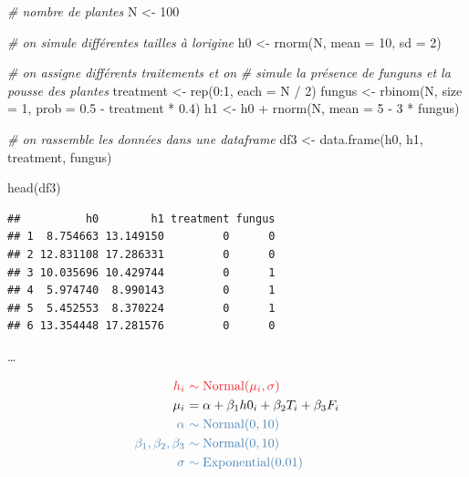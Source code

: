 \documentclass[
  a4paper,11pt,twoside,onecolumn,openright,final,oldfontcommands]{memoir}
\newenvironment{Shaded}{\begin{snugshade}}{\end{snugshade}}
\newcommand{\AttributeTok}[1]{\textcolor[rgb]{0.77,0.63,0.00}{#1}}
\newcommand{\CommentTok}[1]{\textcolor[rgb]{0.56,0.35,0.01}{\textit{#1}}}
\newcommand{\DecValTok}[1]{\textcolor[rgb]{0.00,0.00,0.81}{#1}}
\newcommand{\FloatTok}[1]{\textcolor[rgb]{0.00,0.00,0.81}{#1}}
\newcommand{\FunctionTok}[1]{\textcolor[rgb]{0.00,0.00,0.00}{#1}}
\newcommand{\NormalTok}[1]{#1}
\newcommand{\OtherTok}[1]{\textcolor[rgb]{0.56,0.35,0.01}{#1}}
\newcommand{\SpecialCharTok}[1]{\textcolor[rgb]{0.00,0.00,0.00}{#1}}
\theoremstyle{definition}
\theoremstyle{definition}
\theoremstyle{definition}
\theoremstyle{remark}
\begin{document}
\begin{Shaded}
\begin{Highlighting}[]
\CommentTok{\# nombre de plantes}
\NormalTok{N }\OtherTok{\textless{}{-}} \DecValTok{100}

\CommentTok{\# on simule différentes tailles à l\textquotesingle{}origine}
\NormalTok{h0 }\OtherTok{\textless{}{-}} \FunctionTok{rnorm}\NormalTok{(N, }\AttributeTok{mean =} \DecValTok{10}\NormalTok{, }\AttributeTok{sd =} \DecValTok{2}\NormalTok{)}

\CommentTok{\# on assigne différents traitements et on}
\CommentTok{\# simule la présence de funguns et la pousse des plantes}
\NormalTok{treatment }\OtherTok{\textless{}{-}} \FunctionTok{rep}\NormalTok{(}\DecValTok{0}\SpecialCharTok{:}\DecValTok{1}\NormalTok{, }\AttributeTok{each =}\NormalTok{ N }\SpecialCharTok{/} \DecValTok{2}\NormalTok{)}
\NormalTok{fungus }\OtherTok{\textless{}{-}} \FunctionTok{rbinom}\NormalTok{(N, }\AttributeTok{size =} \DecValTok{1}\NormalTok{, }\AttributeTok{prob =} \FloatTok{0.5} \SpecialCharTok{{-}}\NormalTok{ treatment }\SpecialCharTok{*} \FloatTok{0.4}\NormalTok{)}
\NormalTok{h1 }\OtherTok{\textless{}{-}}\NormalTok{ h0 }\SpecialCharTok{+} \FunctionTok{rnorm}\NormalTok{(N, }\AttributeTok{mean =} \DecValTok{5} \SpecialCharTok{{-}} \DecValTok{3} \SpecialCharTok{*}\NormalTok{ fungus)}

\CommentTok{\# on rassemble les données dans une dataframe}
\NormalTok{df3 }\OtherTok{\textless{}{-}} \FunctionTok{data.frame}\NormalTok{(h0, h1, treatment, fungus)}

\FunctionTok{head}\NormalTok{(df3)}
\end{Highlighting}
\end{Shaded}

\begin{verbatim}
##          h0        h1 treatment fungus
## 1  8.754663 13.149150         0      0
## 2 12.831108 17.286331         0      0
## 3 10.035696 10.429744         0      1
## 4  5.974740  8.990143         0      1
## 5  5.452553  8.370224         0      1
## 6 13.354448 17.281576         0      0
\end{verbatim}

\ldots{}

\[
\begin{aligned}
\color{orangered}{h_{i}} \ &\color{orangered}{\sim \mathrm{Normal}(\mu_{i}, \sigma)} \\
\color{black}{\mu_{i}} \ &\color{black}{= \alpha + \beta_{1} h0_{i} + \beta_{2} T_{i} + \beta_{3} F_{i}} \\
\color{steelblue}{\alpha} \ &\color{steelblue}{\sim \mathrm{Normal}(0, 10)} \\
\color{steelblue}{\beta_{1}, \beta_{2}, \beta_{3}} \ &\color{steelblue}{\sim \mathrm{Normal}(0, 10)} \\
\color{steelblue}{\sigma} \ &\color{steelblue}{\sim \mathrm{Exponential}(0.01)}
\end{aligned}
\]
\end{document}
